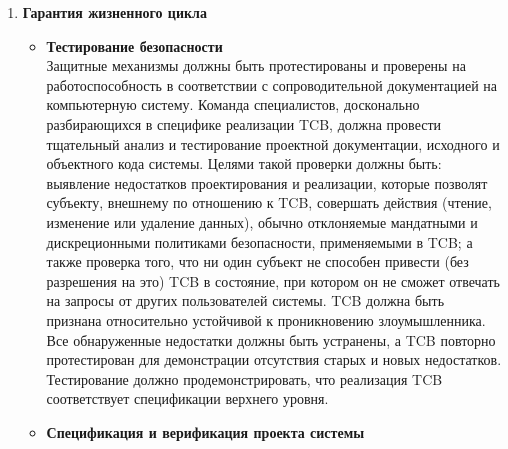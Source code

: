 \begin{enumerate}
\begin{enumerate}
\begin{enumerate}
\begin{enumerate}
\begin{itemize}
					определен, и все элементы TCB должны быть идентифицированы.
					\item{\textbf{Целостность системы}}\\
					Должны быть предусмотрены аппаратные и/или программные средства, которые могут использоваться для периодической проверки правильности работы аппаратных и программных элементов TCB.
					\item{\textbf{Анализ скрытых каналов связи}}\\
					Разработчик системы должен провести тщательный поиск скрытых каналов хранения и определить (либо путем фактических измерений, либо путем инженерной оценки)
					максимальную пропускную способность каждого выявленного канала.
					\item{\textbf{Доверенное управление объектами}}\\
					TCB должен поддерживать раздельные функции оператора и администратора системы.
				\end{itemize}
				\item{\textbf{Гарантия жизненного цикла}}
				\begin{itemize}
					\item{\textbf{Тестирование безопасности}}\\
					Защитные механизмы должны быть протестированы и проверены на работоспособность в соответствии с сопроводительной документацией на компьютерную систему.  Команда специалистов,
					досконально разбирающихся в специфике реализации TCB, должна провести тщательный анализ и тестирование проектной документации, исходного и объектного кода системы. Целями такой
					проверки должны быть: выявление недостатков проектирования и реализации, которые позволят субъекту, внешнему по отношению к TCB, совершать действия (чтение, изменение или удаление данных),
					обычно отклоняемые мандатными и дискреционными политиками безопасности, применяемыми в TCB; а также проверка того, что ни один субъект не способен привести (без разрешения на это)
					TCB в состояние, при котором он не сможет отвечать на запросы от других пользователей системы. TCB должна быть признана относительно устойчивой к проникновению злоумышленника.
					Все обнаруженные недостатки должны быть устранены, а TCB повторно протестирован для демонстрации отсутствия старых и новых недостатков. Тестирование должно продемонстрировать,
					что реализация TCB соответствует спецификации верхнего уровня.
					\item{\textbf{Спецификация и верификация проекта системы}}\\

\end{itemize}
\end{enumerate}
\end{enumerate}
\end{enumerate}
\end{enumerate}
